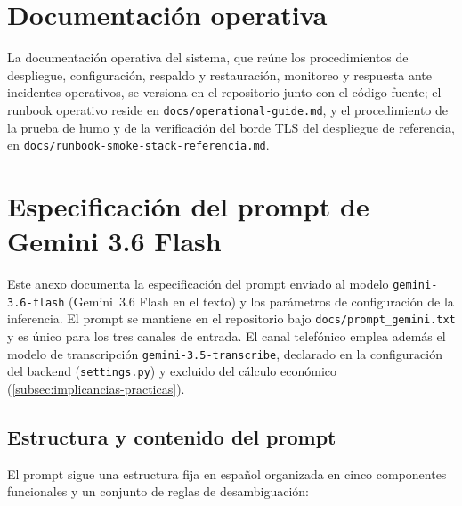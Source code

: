 \section{Documentación operativa}\label{sec:anexo-documentacion-operativa}

La documentación operativa del sistema, que reúne los procedimientos de despliegue, configuración, respaldo y restauración, monitoreo y respuesta ante incidentes operativos, se versiona en el repositorio junto con el código fuente; el runbook operativo reside en \texttt{docs/operational-guide.md}, y el procedimiento de la prueba de humo y de la verificación del borde TLS del despliegue de referencia, en \texttt{docs/runbook-smoke-stack-referencia.md}.

\section{Especificación del prompt de Gemini 3.6 Flash}
\label{anexo:H}

Este anexo documenta la especificación del prompt enviado al modelo \texttt{gemini-3.6-flash} (Gemini~3.6 Flash en el texto) y los parámetros de configuración de la inferencia. El prompt se mantiene en el repositorio bajo \texttt{docs/prompt\_gemini.txt} y es único para los tres canales de entrada. El canal telefónico emplea además el modelo de transcripción \texttt{gemini-3.5-transcribe}, declarado en la configuración del backend (\texttt{settings.py}) y excluido del cálculo económico (\autoref{subsec:implicancias-practicas}).

\subsection{Estructura y contenido del prompt}\label{subsec:anexo-estructura-prompt}

El prompt sigue una estructura fija en español organizada en cinco componentes funcionales y un conjunto de reglas de desambiguación:

